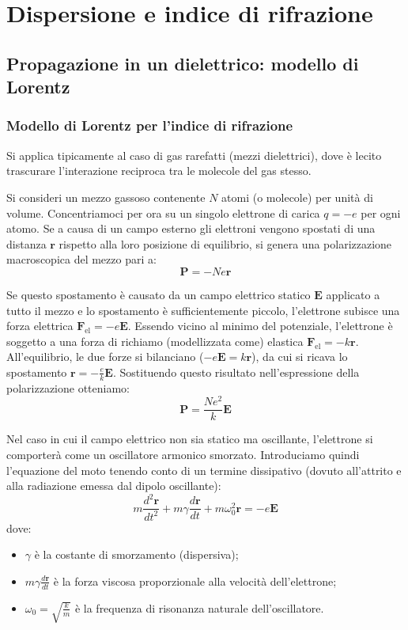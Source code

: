 \documentclass[openany,a4paper,12pt]{book}
\begin{document}
\chapter{Dispersione e indice di rifrazione}
\section{Propagazione in un dielettrico: modello di Lorentz}
\subsection*{Modello di Lorentz per l'indice di rifrazione}

Si applica tipicamente al caso di gas rarefatti (mezzi dielettrici), dove è lecito trascurare l'interazione reciproca tra le molecole del gas stesso. 

Si consideri un mezzo gassoso contenente $N$ atomi (o molecole) per unità di volume. Concentriamoci per ora su un singolo elettrone di carica $q = -e$ per ogni atomo. Se a causa di un campo esterno gli elettroni vengono spostati di una distanza $\mathbf{r}$ rispetto alla loro posizione di equilibrio, si genera una polarizzazione macroscopica del mezzo pari a:
\begin{equation}
    \mathbf{P} = - N e \mathbf{r}
\end{equation}

Se questo spostamento è causato da un campo elettrico statico $\mathbf{E}$ applicato a tutto il mezzo e lo spostamento è sufficientemente piccolo, l'elettrone subisce una forza elettrica $\mathbf{F}_{\text{el}} = -e \mathbf{E}$. Essendo vicino al minimo del potenziale, l'elettrone è soggetto a una forza di richiamo (modellizzata come) elastica $\mathbf{F}_{\text{el}} = -k \mathbf{r}$. 
All'equilibrio, le due forze si bilanciano ($-e \mathbf{E} = k \mathbf{r}$), da cui si ricava lo spostamento $\mathbf{r} = -\frac{e}{k} \mathbf{E}$. Sostituendo questo risultato nell'espressione della polarizzazione otteniamo:
\begin{equation}
    \mathbf{P} = \frac{N e^2}{k} \mathbf{E}
\end{equation}

Nel caso in cui il campo elettrico non sia statico ma oscillante, l'elettrone si comporterà come un oscillatore armonico smorzato. Introduciamo quindi l'equazione del moto tenendo conto di un termine dissipativo (dovuto all'attrito e alla radiazione emessa dal dipolo oscillante):
\begin{equation}
    m \frac{d^2\mathbf{r}}{dt^2} + m \gamma \frac{d\mathbf{r}}{dt} + m \omega_0^2 \mathbf{r} = -e \mathbf{E}
\end{equation}
dove:
\begin{itemize}
    \item $\gamma$ è la costante di smorzamento (dispersiva);
    \item $m \gamma \frac{d\mathbf{r}}{dt}$ è la forza viscosa proporzionale alla velocità dell'elettrone;
    \item $\omega_0 = \sqrt{\frac{k}{m}}$ è la frequenza di risonanza naturale dell'oscillatore.
\end{itemize}
\end{document}
